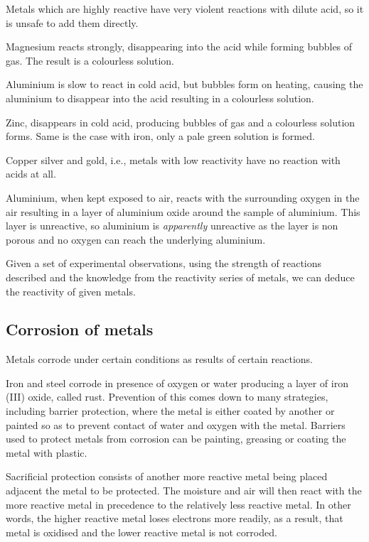 Metals which are highly reactive have very violent reactions with dilute acid, so it is unsafe to
add them directly. 

Magnesium reacts strongly, disappearing into the acid while forming bubbles of
gas. The result is a colourless solution.

Aluminium is slow to react in cold acid, but bubbles form on heating, causing the aluminium to
disappear into the acid resulting in a colourless solution.

Zinc, disappears in cold acid, producing bubbles of gas and a colourless solution forms. Same is
the case with iron, only a pale green solution is formed.

Copper silver and gold, i.e., metals with low reactivity have no reaction with acids at all.

Aluminium, when kept exposed to air, reacts with the surrounding oxygen in the air resulting in
a layer of aluminium oxide around the sample of aluminium. This layer is unreactive, so aluminium
is \textit{apparently} unreactive as the layer is non porous and no oxygen can reach the 
underlying aluminium.

Given a set of experimental observations, using the strength of reactions described and the 
knowledge from the reactivity series of metals, we can deduce the reactivity of given metals.

\subsection{Corrosion of metals}
Metals corrode under certain conditions as results of certain reactions.

Iron and steel corrode in presence of oxygen or water producing a layer of iron (III) oxide, called
rust. Prevention of this comes down to many strategies, including barrier protection, where the
metal is either coated by another or painted so as to prevent contact of water and oxygen with the
metal. Barriers used to protect metals from corrosion can be painting, greasing or coating the
metal with plastic.

Sacrificial protection consists of another more reactive metal being placed adjacent the metal
to be protected. The moisture and air will then react with the more reactive metal in precedence to
the relatively less reactive metal. In other words, the higher reactive metal loses electrons more
readily, as a result, that metal is oxidised and the lower reactive metal is not corroded.

